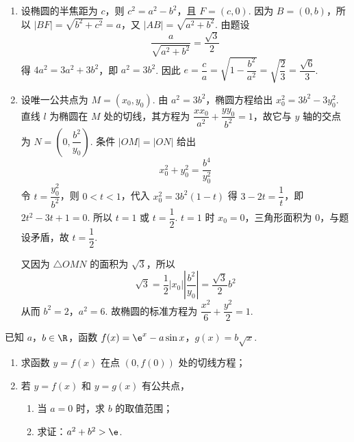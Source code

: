 \begin{solution}
\begin{enumerate}
\item 设椭圆的半焦距为 \(c\)，则 \(c^2=a^2-b^2\)，且 \(F=(c,0)\). 因为 \(B=(0,b)\)，所以 \(|BF|=\sqrt{b^2+c^2}=a\)，又 \(|AB|=\sqrt{a^2+b^2}\). 由题设
\[
\dfrac{a}{\sqrt{a^2+b^2}}=\dfrac{\sqrt{3}}{2}
\]
得 \(4a^2=3a^2+3b^2\)，即 \(a^2=3b^2\). 因此 \(e=\dfrac{c}{a}=\sqrt{1-\dfrac{b^2}{a^2}}=\sqrt{\dfrac23}=\dfrac{\sqrt6}{3}\).
\item 设唯一公共点为 \(M=(x_0,y_0)\). 由 \(a^2=3b^2\)，椭圆方程给出 \(x_0^2=3b^2-3y_0^2\). 直线 \(l\) 为椭圆在 \(M\) 处的切线，其方程为 \(\dfrac{x x_0}{a^2}+\dfrac{y y_0}{b^2}=1\)，故它与 \(y\) 轴的交点为 \(N=(0,\dfrac{b^2}{y_0})\). 条件 \(|OM|=|ON|\) 给出
\[
x_0^2+y_0^2=\dfrac{b^4}{y_0^2}
\]
令 \(t=\dfrac{y_0^2}{b^2}\)，则 \(0<t<1\)，代入 \(x_0^2=3b^2(1-t)\) 得 \(3-2t=\dfrac1t\)，即 \(2t^2-3t+1=0\). 所以 \(t=1\) 或 \(t=\dfrac12\). \(t=1\) 时 \(x_0=0\)，三角形面积为 \(0\)，与题设矛盾，故 \(t=\dfrac12\).

又因为 \(\triangle OMN\) 的面积为 \(\sqrt3\)，所以
\[
\sqrt3=\dfrac12|x_0|\left|\dfrac{b^2}{y_0}\right|=\dfrac{\sqrt3}{2}b^2
\]
从而 \(b^2=2\)，\(a^2=6\). 故椭圆的标准方程为 \(\dfrac{x^2}{6}+\dfrac{y^2}{2}=1\).
\end{enumerate}
\end{solution}

\begin{problem}
已知 \(a\)，\(b\in\R\)，函数 \(f(x)=\e^x-a\sin x\)，\(g(x)=b\sqrt{x}\).

\begin{enumerate}
\item 求函数 \(y=f(x)\) 在点 \((0,f(0))\) 处的切线方程；
\item 若 \(y=f(x)\) 和 \(y=g(x)\) 有公共点，
\begin{enumerate}
\item 当 \(a=0\) 时，求 \(b\) 的取值范围；
\item 求证：\(a^2+b^2>\e\).
\end{enumerate}
\end{enumerate}
\end{problem}

